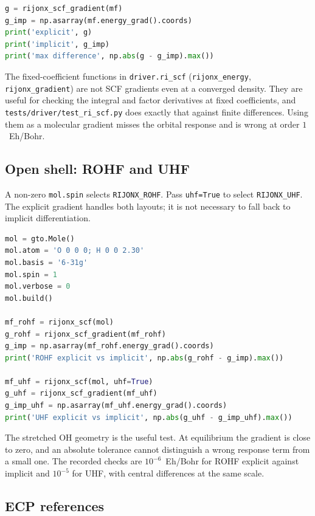 \begin{lstlisting}[language=Python]
g = rijonx_scf_gradient(mf)
g_imp = np.asarray(mf.energy_grad().coords)
print('explicit', g)
print('implicit', g_imp)
print('max difference', np.abs(g - g_imp).max())
\end{lstlisting}

The fixed-coefficient functions in \texttt{driver.ri\_scf}
(\texttt{rijonx\_energy}, \texttt{rijonx\_gradient}) are not SCF
gradients even at a converged density.  They are useful for checking
the integral and factor derivatives at fixed coefficients, and
\texttt{tests/driver/test\_ri\_scf.py} does exactly that against finite
differences.  Using them as a molecular gradient misses the orbital
response and is wrong at order $1$~Eh/Bohr.

\subsection{Open shell: ROHF and UHF}

A non-zero \texttt{mol.spin} selects \texttt{RIJONX\_ROHF}.  Pass
\texttt{uhf=True} to select \texttt{RIJONX\_UHF}.  The explicit
gradient handles both layouts; it is not necessary to fall back to
implicit differentiation.

\begin{lstlisting}[language=Python]
mol = gto.Mole()
mol.atom = 'O 0 0 0; H 0 0 2.30'
mol.basis = '6-31g'
mol.spin = 1
mol.verbose = 0
mol.build()

mf_rohf = rijonx_scf(mol)
g_rohf = rijonx_scf_gradient(mf_rohf)
g_imp = np.asarray(mf_rohf.energy_grad().coords)
print('ROHF explicit vs implicit', np.abs(g_rohf - g_imp).max())

mf_uhf = rijonx_scf(mol, uhf=True)
g_uhf = rijonx_scf_gradient(mf_uhf)
g_imp_uhf = np.asarray(mf_uhf.energy_grad().coords)
print('UHF explicit vs implicit', np.abs(g_uhf - g_imp_uhf).max())
\end{lstlisting}

The stretched OH geometry is the useful test.  At equilibrium the
gradient is close to zero, and an absolute tolerance cannot distinguish
a wrong response term from a small one.  The recorded checks are
$10^{-6}$~Eh/Bohr for ROHF explicit against implicit and $10^{-5}$ for
UHF, with central differences at the same scale.

\subsection{ECP references}

